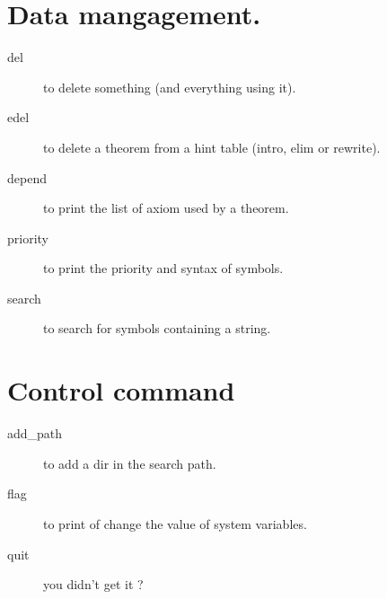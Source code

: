 \documentclass{article}
\begin{document}
\section{Data mangagement.}
\begin{description}
\item[del] to delete something (and everything using it).
\item[edel] to delete a theorem from a hint table (intro, elim or rewrite).
\item[depend] to print the list of axiom used by a theorem. 
\item[priority] to print the priority and syntax of symbols.
\item[search] to search for symbols containing a string.
\end{description}

\section{Control command}
\begin{description}
\item[add\_path] to add a dir in the search path.
\item[flag] to print of change the value of system variables.
\item[quit] you didn't get it ?
\end{description}
\end{document}

